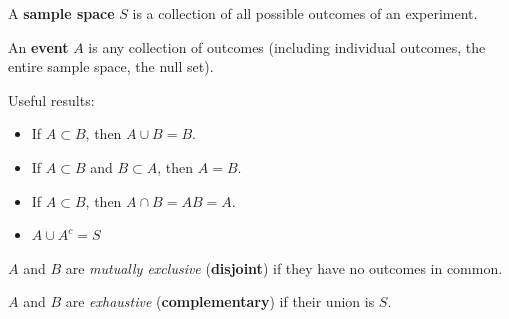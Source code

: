 \documentclass[a4paper,10pt,landscape]{article}
\begin{document}
\begin{multicols*}{3}
\begin{description}
	\item A {\bf sample space} $S$ is a collection of all possible outcomes of an experiment.
	\item An {\bf event} $A$ is any collection of outcomes (including individual outcomes, the entire sample space, the null set).
	\item Useful results:
	\begin{itemize}[itemsep=0.25pt,topsep=0.5pt]
		\item If $A\subset B$, then $A\cup B=B$.
		\item If $A\subset B$ and $B\subset A$, then $A=B$.
		\item If $A\subset B$, then $A\cap B=AB=A$.
		\item $A\cup A^c=S$
	\end{itemize}
	\item $A$ and $B$ are {\it mutually exclusive} ({\bf disjoint}) if they have no outcomes in common.
	\item $A$ and $B$ are {\it exhaustive} ({\bf complementary}) if their union is $S$.
\end{description}

\end{multicols*}
\end{document}
